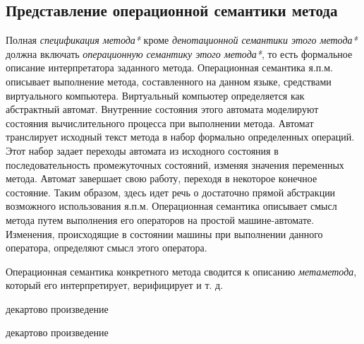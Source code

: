 \subsection{Представление операционной семантики метода}
\label{sec_programs_method_op_semantic}

Полная \textit{спецификация метода*} кроме \textit{денотационной семантики этого метода*} должна включать \textit{операционную семантику этого метода*}, то есть формальное описание интерпретатора заданного метода. Операционная семантика я.п.м. описывает выполнение метода, составленного на данном языке, средствами виртуального компьютера. Виртуальный компьютер определяется как абстрактный автомат. Внутренние состояния этого автомата моделируют состояния вычислительного процесса при выполнении метода. Автомат транслирует исходный текст метода в набор формально определенных операций. Этот набор задает переходы автомата из исходного состояния в последовательность промежуточных состояний, изменяя значения переменных метода. Автомат завершает свою работу, переходя в некоторое конечное состояние. Таким образом, здесь идет речь о достаточно прямой абстракции возможного использования я.п.м. Операционная семантика описывает смысл метода путем выполнения его операторов на простой машине-автомате. Изменения, происходящие в состоянии машины при выполнении данного оператора, определяют смысл этого оператора.

Операционная семантика конкретного метода сводится к описанию \textit{метаметода}, который его интерпретирует, верифицирует и т. д.

\begin{SCn}
\end{SCn}

\begin{SCn}
\begin{scnindent}
    \begin{scnreltovector}{декартово произведение}
    \end{scnreltovector}
\end{scnindent}
\begin{scnindent}
    \begin{scnreltovector}{декартово произведение}
    \end{scnreltovector}
\end{scnindent}
\end{SCn}

